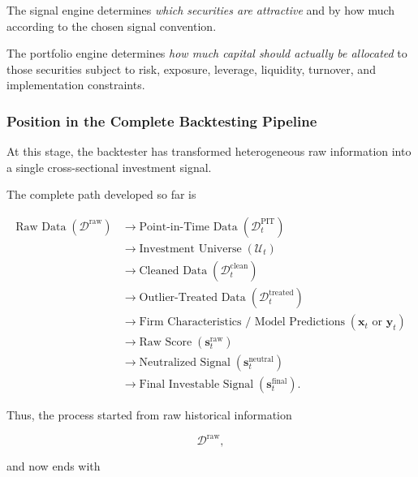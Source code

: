 \documentclass[11pt,a4paper]{article}
\begin{document}
The signal engine determines \emph{which securities are attractive} and by how
much according to the chosen signal convention.

The portfolio engine determines \emph{how much capital should actually be
allocated} to those securities subject to risk, exposure, leverage, liquidity,
turnover, and implementation constraints.

\subsubsection{Position in the Complete Backtesting Pipeline}

At this stage, the backtester has transformed heterogeneous raw information into
a single cross-sectional investment signal.

The complete path developed so far is

\begin{equation}
\boxed{
\begin{aligned}
\text{Raw Data}
\;(\mathcal{D}^{\mathrm{raw}})
&\rightarrow
\text{Point-in-Time Data}
\;(\mathcal{D}_t^{\mathrm{PIT}})
\\
&\rightarrow
\text{Investment Universe}
\;(\mathcal{U}_t)
\\
&\rightarrow
\text{Cleaned Data}
\;(\mathcal{D}_t^{\mathrm{clean}})
\\
&\rightarrow
\text{Outlier-Treated Data}
\;(\mathcal{D}_t^{\mathrm{treated}})
\\
&\rightarrow
\text{Firm Characteristics / Model Predictions}
\;(\mathbf{x}_t \text{ or } \widehat{\mathbf{y}}_t)
\\
&\rightarrow
\text{Raw Score}
\;(\mathbf{s}_t^{\mathrm{raw}})
\\
&\rightarrow
\text{Neutralized Signal}
\;(\mathbf{s}_t^{\mathrm{neutral}})
\\
&\rightarrow
\text{Final Investable Signal}
\;(\mathbf{s}_t^{\mathrm{final}}).
\end{aligned}
}
\end{equation}

Thus, the process started from raw historical information

\begin{equation}
\mathcal{D}^{\mathrm{raw}},
\end{equation}

and now ends with
\end{document}
